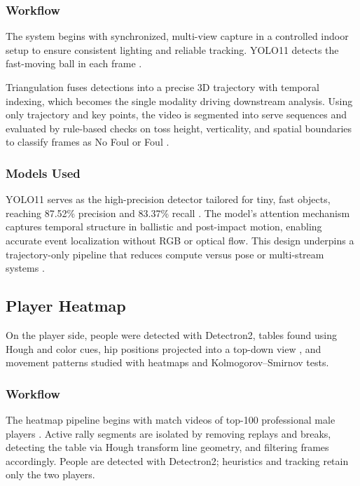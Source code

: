 \documentclass[conference]{IEEEtran}
\begin{document}
\subsubsection{Workflow}

The system begins with synchronized, multi-view capture in a controlled indoor setup \cite{art} to ensure consistent lighting and reliable tracking. YOLO11 detects the fast-moving ball in each frame \cite{art}.

Triangulation fuses detections into a precise 3D trajectory with temporal indexing, which becomes the single modality driving downstream analysis. Using only trajectory and key points, the video is segmented into serve sequences and evaluated by rule-based checks on toss height, verticality, and spatial boundaries to classify frames as No Foul or Foul \cite{electronics14010027}.

\subsubsection{Models Used}

YOLO11 serves as the high-precision detector tailored for tiny, fast objects, reaching 87.52\% precision and 83.37\% recall\cite{electronics14010027} . The model's attention mechanism captures temporal structure in ballistic and post-impact motion, enabling accurate event localization without RGB or optical flow\cite{electronics14010027}. This design underpins a trajectory-only pipeline that reduces compute versus pose or multi-stream systems \cite{electronics14010027}.

\subsection{Player Heatmap}

On the player side, people were detected with Detectron2, tables found using Hough and color cues, hip positions projected into a top-down view , and movement patterns studied with heatmaps and Kolmogorov--Smirnov tests.\cite{haas2023heatmap}

\subsubsection{Workflow}

The heatmap pipeline begins with match videos of top-100 professional male players \cite{haas2023heatmap}. Active rally segments are isolated by removing replays and breaks, detecting the table via Hough transform line geometry, and filtering frames accordingly. People are detected with Detectron2; heuristics and tracking retain only the two players.
\end{document}
